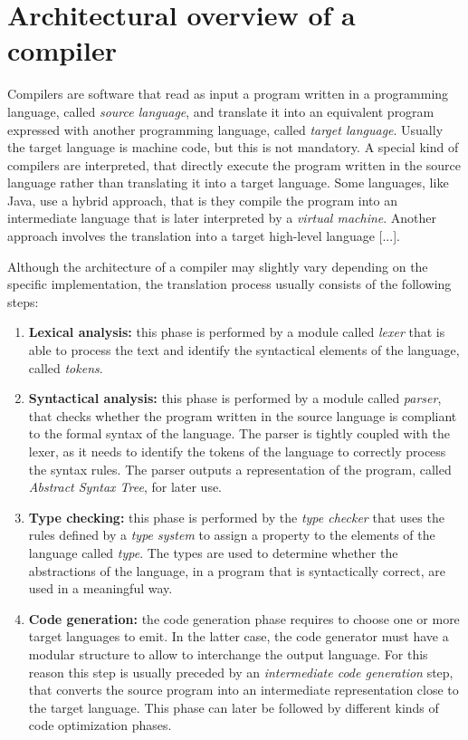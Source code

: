 \section{Architectural overview of a compiler}
\label{sec:ch_background_compiler_architecture}
Compilers are software that read as input a program written in a programming language, called \textit{source language}, and translate it into an equivalent program expressed with another programming language, called \textit{target language}. Usually the target language is machine code, but this is not mandatory. A special kind of compilers are interpreted, that directly execute the program written in the source language rather than translating it into a target language. Some languages, like Java, use a hybrid approach, that is they compile the program into an intermediate language that is later interpreted by a \textit{virtual machine}. Another approach involves the translation into a target high-level language [...].

Although the architecture of a compiler may slightly vary depending on the specific implementation, the translation process usually consists of the following steps:

\begin{enumerate}
	\item \textbf{Lexical analysis:} this phase is performed by a module called \textit{lexer} that is able to process the text and identify the syntactical elements of the language, called \textit{tokens}.
	\item \textbf{Syntactical analysis:} this phase is performed by a module called \textit{parser}, that checks whether the program written in the source language is compliant to the formal syntax of the language. The parser is tightly coupled with the lexer, as it needs to identify the tokens of the language to correctly process the syntax rules. The parser outputs a representation of the program, called \textit{Abstract Syntax Tree}, for later use.
	\item \textbf{Type checking:} this phase is performed by the \textit{type checker} that uses the rules defined by a \textit{type system} to assign a property to the elements of the language called \textit{type}. The types are used to determine whether the abstractions of the language, in a program that is syntactically correct, are used in a meaningful way.
	\item \textbf{Code generation:} the code generation phase requires to choose one or more target languages to emit. In the latter case, the code generator must have a modular structure to allow to interchange the output language. For this reason this step is usually preceded by an \textit{intermediate code generation} step, that converts the source program into an intermediate representation close to the target language. This phase can later be followed by different kinds of code optimization phases.
\end{enumerate}

